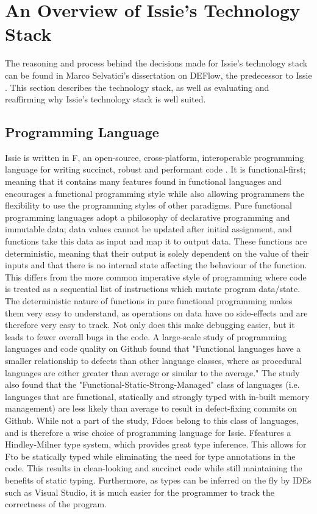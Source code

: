 \section{An Overview of Issie's Technology Stack} \label{sec:techstack}

The reasoning and process behind the decisions made for Issie's technology stack can be found in Marco Selvatici's dissertation on DEFlow, the predecessor to Issie \cite{marco_diss}. This section describes the technology stack, as well as evaluating and reaffirming why Issie's technology stack is well suited.

\subsection{Programming Language} \label{subsec:fsharp}
Issie is written in F\fsharp, an open-source, cross-platform, interoperable programming language for writing succinct, robust and performant code \cite{fsharp}. It is functional-first; meaning that it contains many features found in functional languages and encourages a functional programming style while also allowing programmers the flexibility to use the programming styles of other paradigms. Pure functional programming languages adopt a philosophy of declarative programming and immutable data; data values cannot be updated after initial assignment, and functions take this data as input and map it to output data. These functions are deterministic, meaning that their output is solely dependent on the value of their inputs and that there is no internal state affecting the behaviour of the function. This differs from the more common imperative style of programming where code is treated as a sequential list of instructions which mutate program data/state. The deterministic nature of functions in pure functional programming makes them very easy to understand, as operations on data have no side-effects and are therefore very easy to track. Not only does this make debugging easier, but it leads to fewer overall bugs in the code. A large-scale study of programming languages and code quality on Github \cite{functionaldebug} found that "Functional languages have a smaller relationship to defects than other language classes, where as procedural languages are either greater than average or similar to the average." The study also found that the "Functional-Static-Strong-Managed" class of languages (i.e. languages that are functional, statically and strongly typed with in-built memory management) are  less likely than average to result in defect-fixing commits on Github.
While not a part of the study, F\fsharp does belong to this class of languages, and is therefore a wise choice of programming language for Issie. F\fsharp features a Hindley-Milner type system, which provides great type inference. This allows for F\fsharp to be statically typed while eliminating the need for type annotations in the code. This results in clean-looking and succinct code while still maintaining the benefits of static typing.  Furthermore, as types can be inferred on the fly by IDEs such as Visual Studio, it is much easier for the programmer to track the correctness of the program. 

